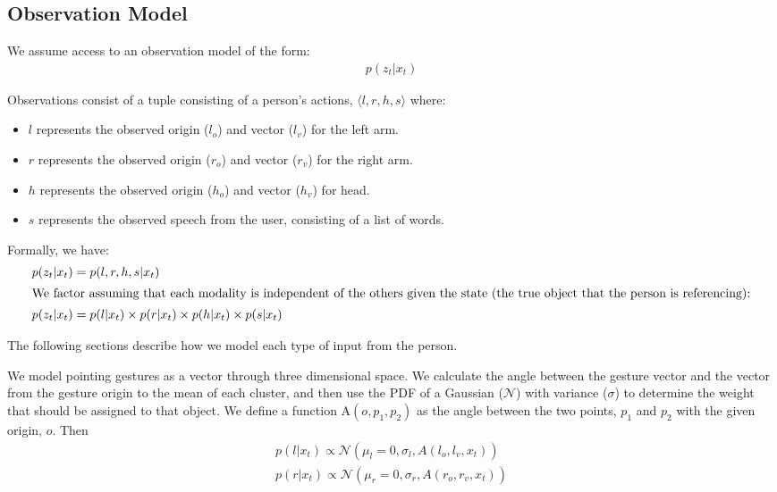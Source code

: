 \documentclass[letterpaper, 10 pt, conference]{ieeeconf}
\begin{document}
\subsection{Observation Model}

We assume access to an observation model of the form:
\begin{align}
p(z_t | x_t)
\end{align}

Observations consist of a tuple consisting of a person's actions,
$\langle l, r, h, s\rangle $ where:
\begin{itemize}
	\item $l$ represents the observed origin ($l_o$) and vector ($l_v$) for the left arm.
	\item $r$ represents the observed origin  ($r_o$) and vector ($r_v$)  for the right arm.
	\item $h$ represents the observed origin  ($h_o$) and vector ($h_v$)  for head.
	\item $s$ represents the observed speech from the user,
          consisting of a list of words.
	\end{itemize}

Formally, we have:
\begin{align}
p(z_t | x_t) &= p(l, r, h, s | x_t)\\
\intertext{We factor assuming that each modality is independent of the others given the state (the true object that the person is referencing):}
p(z_t | x_t) &= p(l | x_t) \times p(r | x_t) \times p(h | x_t) \times p(s | x_t)
\end{align}

\noindent The following sections describe how we model each type of
input from the person.

  We model pointing gestures as a vector
through three dimensional space. We calculate the angle between the
gesture vector and the vector from the gesture origin to the mean of
each cluster, and then use the PDF of a Gaussian ($\mathcal{N}$) with variance ($\sigma$) to determine the weight that should be
assigned to that object. We define a function $\mbox{A}(o, p_1, p_2)$ as the
angle between the two points, $p_1$ and $p_2$ with the given origin,
$o$.  Then 
\begin{align}
p(l | x_t) \propto \mathcal{N}(\mu_l=0, \sigma_l,A(l_o, l_v, x_t))\\
p(r | x_t) \propto \mathcal{N}(\mu_r=0, \sigma_r,A(r_o, r_v, x_t))
\end{align}
\end{document}
